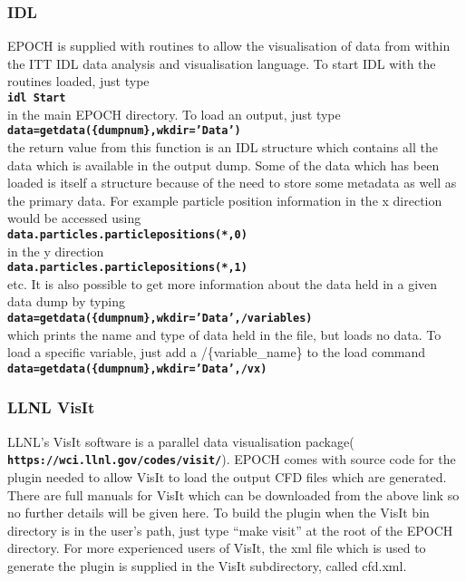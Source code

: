 \documentclass[12pt]{article}
\newcommand{\inlinecode}[1]{{\color{warwickred} \bf\texttt{#1}}}
\newcommand{\nEPOCH}{{\color{warwickdark}\fontfamily{phv}\selectfont EPOCH}}
\newcommand{\EPOCH}{{\nEPOCH} }
\begin{document}
\subsubsection{IDL}
\EPOCH is supplied with routines to allow the visualisation of data from
within the ITT IDL data analysis and visualisation language. To start IDL with
the routines loaded, just type\\
\inlinecode{idl Start}\\
in the main \EPOCH directory. To load an output, just type\\
\inlinecode{data=getdata(\{dumpnum\},wkdir='Data')}\\
the return value from this function is an IDL structure which contains all the
data which is available in the output dump. Some of the data which has been
loaded is itself a structure because of the need to store some metadata as
well as the primary data. For example particle position information in the x
direction would be accessed using\\
\inlinecode{data.particles.particlepositions(*,0)}\\
in the y direction\\
\inlinecode{data.particles.particlepositions(*,1)}\\
etc. It is also possible to get more information about the data held in a
given data dump by typing\\
\inlinecode{data=getdata(\{dumpnum\},wkdir='Data',/variables)}\\
which prints the name and type of data held in the file, but loads no data. To
load a specific variable, just add a /\{variable\_name\} to the load command\\
\inlinecode{data=getdata(\{dumpnum\},wkdir='Data',/vx)}\\

\subsubsection{LLNL VisIt}
LLNL's VisIt software is a parallel data visualisation
package(\inlinecode{https://wci.llnl.gov/codes/visit/}). \EPOCH comes with
source code for the plugin needed to allow VisIt to load the output CFD files
which are generated. There are full manuals for VisIt which can be downloaded
from the above link so no further details will be given here. To build the
plugin when the VisIt bin directory is in the user's path, just type ``make
visit'' at the root of the \EPOCH directory. For more experienced users of
VisIt, the xml file which is used to generate the plugin is supplied in the
VisIt subdirectory, called cfd.xml.
\end{document}
